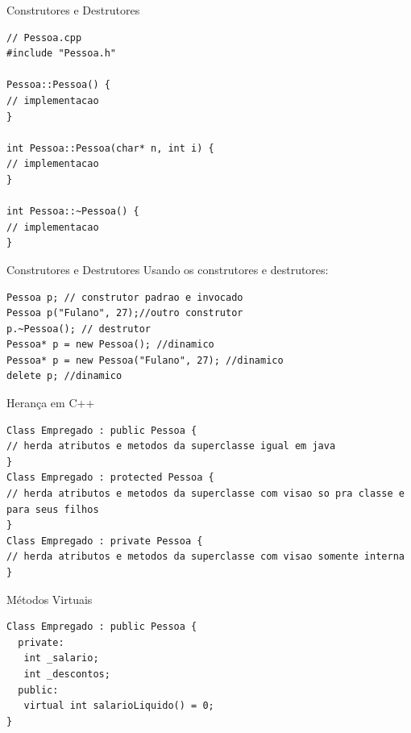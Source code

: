 \documentclass[12pt,table,xcolor={dvipsnames}]{beamer}
\begin{document}
\begin{frame}[fragile]{Construtores e Destrutores}
\begin{lstlisting}
// Pessoa.cpp
#include "Pessoa.h"

Pessoa::Pessoa() {
// implementacao
}

int Pessoa::Pessoa(char* n, int i) {
// implementacao
}

int Pessoa::~Pessoa() {
// implementacao
}
\end{lstlisting}
\end{frame}

\begin{frame}[fragile]{Construtores e Destrutores}
Usando os construtores e destrutores:
\begin{lstlisting}
Pessoa p; // construtor padrao e invocado
Pessoa p("Fulano", 27);//outro construtor
p.~Pessoa(); // destrutor
Pessoa* p = new Pessoa(); //dinamico
Pessoa* p = new Pessoa("Fulano", 27); //dinamico
delete p; //dinamico
\end{lstlisting}
\end{frame}

\begin{frame}[fragile]{Herança em C++}
\begin{lstlisting}
Class Empregado : public Pessoa {
// herda atributos e metodos da superclasse igual em java
}
Class Empregado : protected Pessoa {
// herda atributos e metodos da superclasse com visao so pra classe e para seus filhos
}
Class Empregado : private Pessoa {
// herda atributos e metodos da superclasse com visao somente interna
}
\end{lstlisting}
\end{frame}

\begin{frame}[fragile]{Métodos Virtuais}
\begin{lstlisting}
Class Empregado : public Pessoa {
  private:
   int _salario;
   int _descontos;
  public:
   virtual int salarioLiquido() = 0;
}
\end{lstlisting}
\end{frame}
\end{document}
